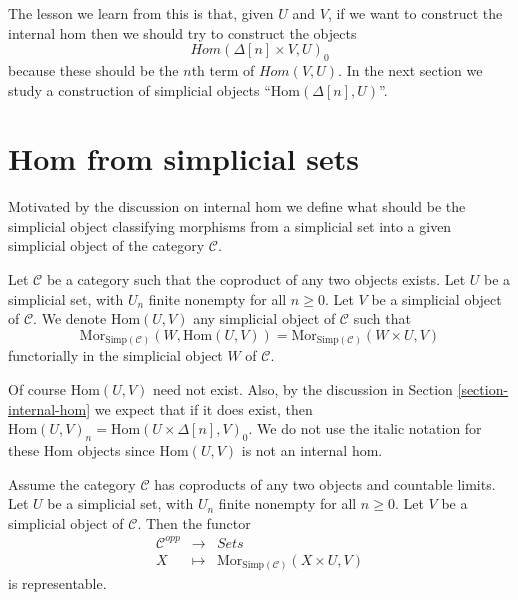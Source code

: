 \medskip\noindent
The lesson we learn from this is that, given $U$ and $V$,
if we want to construct the internal hom then we should try to
construct the objects
$$
\textit{Hom}(\Delta[n] \times V, U)_0
$$
because these should be the $n$th term of $\textit{Hom}(V, U)$.
In the next section we study a construction of simplicial objects
``$\text{Hom}(\Delta[n], U)$''.


\section{Hom from simplicial sets}
\label{section-hom-from-simplicial-sets}

\noindent
Motivated by the discussion on internal hom we define
what should be the simplicial object classifying
morphisms from a simplicial set into a given
simplicial object of the category $\mathcal{C}$.

\begin{definition}
\label{definition-hom-from-simplicial-set}
Let $\mathcal{C}$ be a category such that the coproduct
of any two objects exists.
Let $U$ be a simplicial set, with $U_n$ finite nonempty
for all $n \geq 0$.
Let $V$ be a simplicial object of $\mathcal{C}$.
We denote {\it $\text{Hom}(U, V)$} any simplicial object of
$\mathcal{C}$ such that
$$
\text{Mor}_{\text{Simp}(\mathcal{C})}(W, \text{Hom}(U, V))
=
\text{Mor}_{\text{Simp}(\mathcal{C})}(W \times U, V)
$$
functorially in the simplicial object $W$ of $\mathcal{C}$.
\end{definition}

\noindent
Of course $\text{Hom}(U, V)$ need not exist.
Also, by the discussion in Section \ref{section-internal-hom}
we expect that if it does exist, then
$\text{Hom}(U, V)_n = \text{Hom}(U \times \Delta[n], V)_0$.
We do not use the italic notation for these Hom objects
since $\text{Hom}(U, V)$ is not an internal hom.

\begin{lemma}
\label{lemma-exists-hom-0-from-simplicial-set}
Assume the category $\mathcal{C}$
has coproducts of any two objects and countable
limits. Let $U$ be a simplicial set, with $U_n$ finite nonempty
for all $n \geq 0$.
Let $V$ be a simplicial object of $\mathcal{C}$.
Then the functor
\begin{eqnarray*}
\mathcal{C}^{opp} & \longrightarrow & \textit{Sets} \\
X
& \longmapsto &
\text{Mor}_{\text{Simp}(\mathcal{C})}(X \times U, V)
\end{eqnarray*}
is representable.
\end{lemma}

